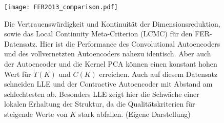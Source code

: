 \begin{figure}[ht]
	\begin{center}
		\texttt{[image: FER2013\_comparison.pdf]}
	\end{center}
	\caption[Qualitätskriterien für den FER-Datensatz]{Die Vertrauenswürdigkeit und Kontinuität der Dimensionsreduktion, sowie das Local Continuity Meta-Criterion (LCMC) für den FER-Datensatz. Hier ist die Performance des Convolutional Autoencoders und des vollvernetzten Autoencoders nahezu identisch. Aber auch der Autoencoder und die Kernel PCA können einen konstant hohen Wert für $T(K)$ und $C(K)$ erreichen. Auch auf diesem Datensatz schneiden LLE und der Contractive Autoencoder mit Abstand am schlechtesten ab. Besonders LLE zeigt hier die Schwäche einer lokalen Erhaltung der Struktur, da die Qualitätskriterien für steigende Werte von $K$ stark abfallen. (Eigene Darstellung)}
	\label{fig:FER2013Metrics}
\end{figure}


